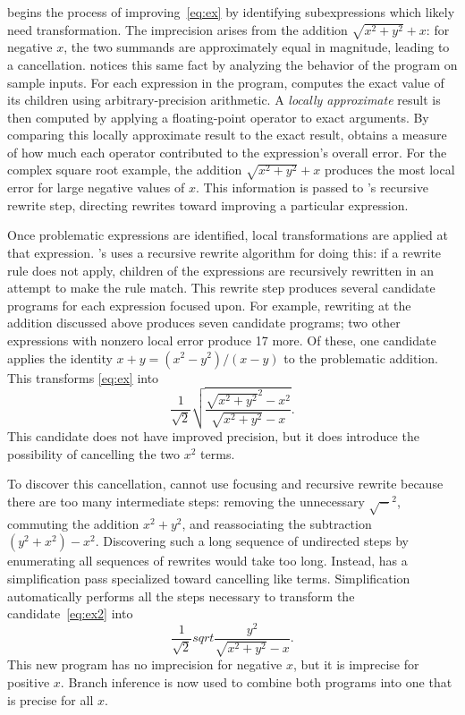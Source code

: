 \documentclass[paper.tex]{subfiles}
\begin{document}
\casio begins the process of improving~\eqref{eq:ex}
  by identifying subexpressions
  which likely need transformation.
The imprecision arises from the addition $\sqrt{x^2 + y^2} + x$:
  for negative $x$,
  the two summands are approximately equal in magnitude,
  leading to a cancellation.
\casio notices this same fact
  by analyzing the behavior of the program on sample inputs.
For each expression in the program,
  \casio computes the exact value of its children
  using arbitrary-precision arithmetic.
A \emph{locally approximate} result is then computed
  by applying a floating-point operator to exact arguments.
By comparing this locally approximate result to the exact result,
  \casio obtains a measure of how much each operator
  contributed to the expression's overall error.
For the complex square root example,
  the addition $\sqrt{x^2 + y^2} + x$ produces the most local error
  for large negative values of $x$.
This information is passed to \casio's recursive rewrite step,
  directing rewrites toward improving a particular expression.

Once problematic expressions are identified,
  local transformations are applied at that expression.
\casio's uses a recursive rewrite algorithm for doing this:
  if a rewrite rule does not apply,
  children of the expressions are recursively rewritten
  in an attempt to make the rule match.
This rewrite step produces several candidate programs
  for each expression focused upon.
For example, rewriting at the addition discussed above
  produces seven candidate programs;
  two other expressions with nonzero local error produce 17 more.
Of these, one candidate applies the identity
  $x + y = (x^2 - y^2) / (x - y)$ to the problematic addition.
This transforms \eqref{eq:ex} into
\begin{equation} \label{eq:ex2}
  \frac1{\sqrt2} \sqrt{\frac{\sqrt{x^2 + y^2}^2 - x^2}{\sqrt{x^2 + y^2} - x}}.
\end{equation}
This candidate does not have improved precision,
  but it does introduce the possibility
  of cancelling the two $x^2$ terms.

To discover this cancellation,
  \casio cannot use focusing and recursive rewrite
  because there are too many intermediate steps:
  removing the unnecessary $\sqrt{-}^2$,
  commuting the addition $x^2 + y^2$,
  and reassociating the subtraction $(y^2 + x^2) - x^2$.
Discovering such a long sequence of undirected steps
  by enumerating all sequences of rewrites
  would take too long.
Instead, \casio has a simplification pass
  specialized toward cancelling like terms.
Simplification automatically performs all the steps necessary
  to transform the candidate~\eqref{eq:ex2} into
\begin{equation} \label{eq:ex3}
  \frac1{\sqrt2} sqrt{\frac{y^2}{\sqrt{x^2 + y^2} - x}}.
\end{equation}
This new program has no imprecision for negative $x$,
  but it is imprecise for positive $x$.
Branch inference is now used to combine both programs
  into one that is precise for all $x$.
\end{document}
